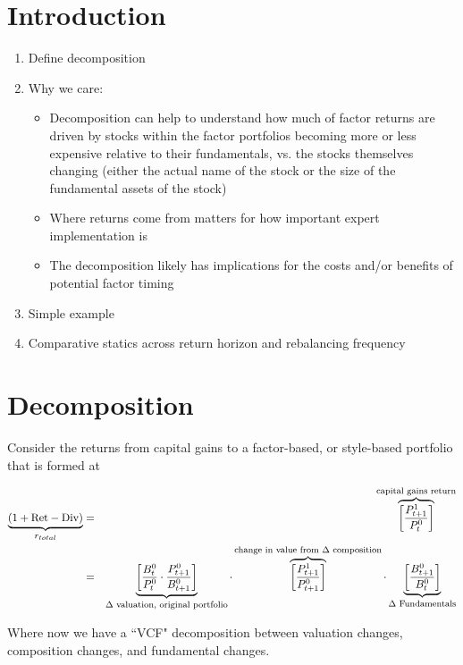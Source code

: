 \documentclass[12pt]{article}
\begin{document}
\section{Introduction}
\begin{enumerate}
\item Define decomposition
\item Why we care:
\begin{itemize}
\item Decomposition can help to understand how much of factor returns are driven by stocks within the factor portfolios becoming more or less expensive relative to their fundamentals, vs. the stocks themselves changing (either the actual name of the stock or the size of the fundamental assets of the stock)
\item Where returns come from matters for how important expert implementation is
\item The decomposition likely has implications for the costs and/or benefits of potential factor timing
\end{itemize}
\item Simple example
\item Comparative statics across return horizon and rebalancing frequency
\end{enumerate}

\section{Decomposition}
Consider the returns from capital gains to a factor-based, or style-based portfolio that is formed at

\begin{eqnarray*}
\underbrace{(1+\mbox{Ret} -\mbox{Div})}_{\mbox{\footnotesize $r_{total}$}}&=& \overbrace{\left[ \frac{P^1_{t+1}}{P^0_t} \right]}^{\mbox{\footnotesize capital gains return}}\\
 &=& 
\underbrace{\left[ \frac{B^0_t}{P^0_t} \cdot \frac{P^0_{t+1}}{B^0_{t+1}}\right]}_{\mbox{\footnotesize $\Delta$ valuation, original portfolio}} \cdot 
\overbrace{\left[\frac{P^1_{t+1}}{P^0_{t+1}}\right]}^{\mbox{\footnotesize change in value from $\Delta$ composition}} \cdot \underbrace{ \left[ \frac{B^0_{t+1}}{B^0_t} \right]}_{\mbox{\footnotesize $\Delta$ Fundamentals}}
\end{eqnarray*}

Where now we have a ``VCF" decomposition between valuation changes, composition changes, and fundamental changes.
\end{document}
